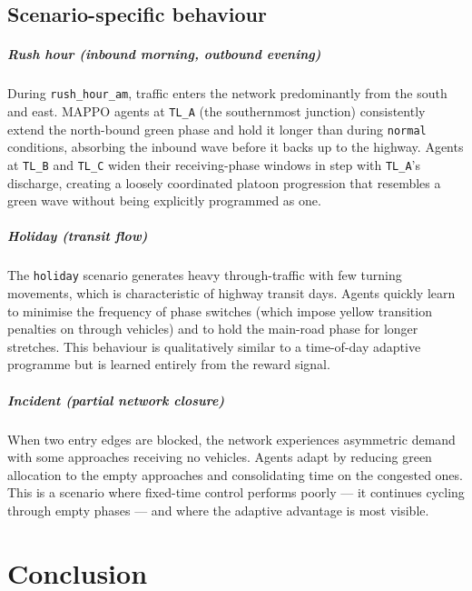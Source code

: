 \documentclass[11pt, a4paper]{report}
\begin{document}
\section{Scenario-specific behaviour}

\paragraph{Rush hour (inbound morning, outbound evening)}

During \texttt{rush\_hour\_am}, traffic enters the network predominantly from the south and east. MAPPO agents at \texttt{TL\_A} (the southernmost junction) consistently extend the north-bound green phase and hold it longer than during \texttt{normal} conditions, absorbing the inbound wave before it backs up to the highway. Agents at \texttt{TL\_B} and \texttt{TL\_C} widen their receiving-phase windows in step with \texttt{TL\_A}'s discharge, creating a loosely coordinated platoon progression that resembles a green wave without being explicitly programmed as one.

\paragraph{Holiday (transit flow)}

The \texttt{holiday} scenario generates heavy through-traffic with few turning movements, which is characteristic of highway transit days. Agents quickly learn to minimise the frequency of phase switches (which impose yellow transition penalties on through vehicles) and to hold the main-road phase for longer stretches. This behaviour is qualitatively similar to a time-of-day adaptive programme but is learned entirely from the reward signal.

\paragraph{Incident (partial network closure)}

When two entry edges are blocked, the network experiences asymmetric demand with some approaches receiving no vehicles. Agents adapt by reducing green allocation to the empty approaches and consolidating time on the congested ones. This is a scenario where fixed-time control performs poorly --- it continues cycling through empty phases --- and where the adaptive advantage is most visible.

\chapter{Conclusion}
\end{document}
